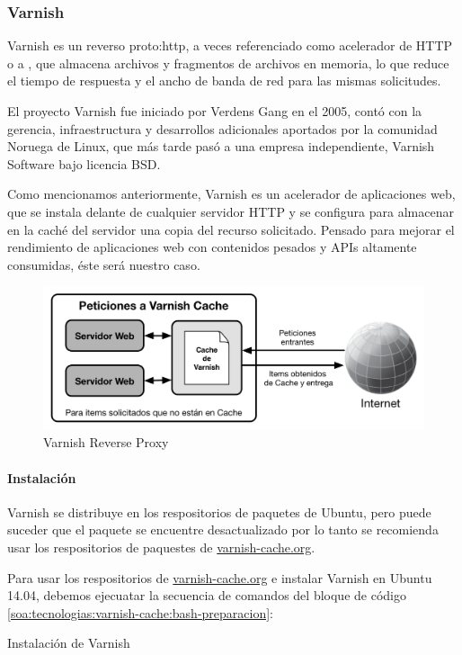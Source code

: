 \subsubsection{Varnish}
\label{soa:tecnologias:varnish}

Varnish es un  reverso \gls{proto:http}, a veces referenciado como acelerador de HTTP o a , que almacena archivos y fragmentos de archivos en memoria, lo que reduce el tiempo de respuesta y el ancho de banda de red para las mismas solicitudes.\cite[p.~20]{varnish2016}

El proyecto Varnish fue iniciado por Verdens Gang en el 2005, contó con la gerencia, infraestructura y desarrollos adicionales aportados por la comunidad Noruega de Linux, que más tarde pasó a una empresa independiente, Varnish Software bajo licencia BSD.

Como mencionamos anteriormente, Varnish es un acelerador de aplicaciones web, que se instala delante de cualquier servidor HTTP y se configura para almacenar en la caché del servidor una copia del recurso solicitado. Pensado para mejorar el rendimiento de aplicaciones web con contenidos pesados y APIs altamente consumidas, éste será nuestro caso.

\begin{figure}[H]
  \includegraphics[width=\linewidth]{src/images/03-capitulo-3/tecnologias/varnish/varnish-reverse-proxy.png}
  \caption{Varnish Reverse Proxy}
  \label{fig:varnish}
\end{figure}

\paragraph{Instalación}

Varnish se distribuye en los respositorios de paquetes de Ubuntu, pero puede suceder que el paquete se encuentre desactualizado por lo tanto se recomienda usar los respositorios de paquestes de \url{varnish-cache.org}.

Para usar los respositorios de \url{varnish-cache.org} e instalar Varnish en Ubuntu 14.04, debemos ejecuatar la secuencia de comandos del bloque de código \autoref{soa:tecnologias:varnish-cache:bash-preparacion}:

\begin{listing}[H]
  \caption{Instalación de Varnish}
  \label{soa:tecnologias:varnish-cache:bash-preparacion}
\end{listing}
